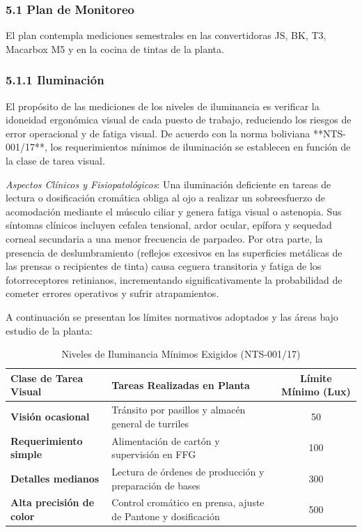 \documentclass[11pt, letterpaper]{article}
\begin{document}
\subsubsection{5.1 Plan de Monitoreo}
El plan contempla mediciones semestrales en las convertidoras JS, BK, T3, Macarbox M5 y en la cocina de tintas de la planta.

\subsubsection{5.1.1 Iluminación}
El propósito de las mediciones de los niveles de iluminancia es verificar la idoneidad ergonómica visual de cada puesto de trabajo, reduciendo los riesgos de error operacional y de fatiga visual. De acuerdo con la norma boliviana **NTS-001/17**, los requerimientos mínimos de iluminación se establecen en función de la clase de tarea visual.

\textit{Aspectos Clínicos y Fisiopatológicos}: Una iluminación deficiente en tareas de lectura o dosificación cromática obliga al ojo a realizar un sobreesfuerzo de acomodación mediante el músculo ciliar y genera fatiga visual o astenopia. Sus síntomas clínicos incluyen cefalea tensional, ardor ocular, epífora y sequedad corneal secundaria a una menor frecuencia de parpadeo. Por otra parte, la presencia de deslumbramiento (reflejos excesivos en las superficies metálicas de las prensas o recipientes de tinta) causa ceguera transitoria y fatiga de los fotorreceptores retinianos, incrementando significativamente la probabilidad de cometer errores operativos y sufrir atrapamientos.

A continuación se presentan los límites normativos adoptados y las áreas bajo estudio de la planta:

\begin{table}[H]
    \centering
    \small
    \caption{Niveles de Iluminancia Mínimos Exigidos (NTS-001/17)}
    \begin{tabular}{llc}
        \toprule
        \textbf{Clase de Tarea Visual} & \textbf{Tareas Realizadas en Planta} & \textbf{Límite Mínimo (Lux)} \\
        \midrule
        \textbf{Visión ocasional} & Tránsito por pasillos y almacén general de turriles & 50 \\
        \textbf{Requerimiento simple} & Alimentación de cartón y supervisión en FFG & 100 \\
        \textbf{Detalles medianos} & Lectura de órdenes de producción y preparación de bases & 300 \\
        \textbf{Alta precisión de color} & Control cromático en prensa, ajuste de Pantone y dosificación & 500 \\
        \bottomrule
    \end{tabular}
\end{table}
\end{document}
